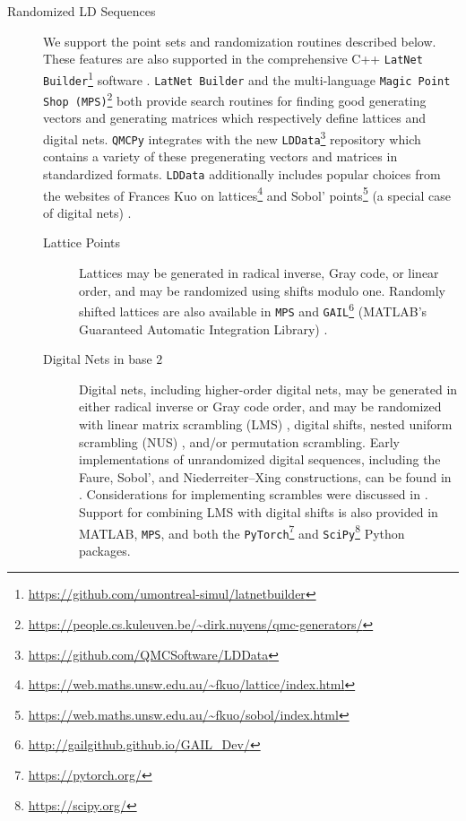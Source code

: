 \documentclass[acmsmall]{acmart}
\begin{document}
\begin{description}
    \item[Randomized LD Sequences] We support the point sets and randomization routines described below. These features are also supported in the comprehensive C++ \texttt{LatNet Builder}\footnote{\label{url:latnetbuilder}\url{https://github.com/umontreal-simul/latnetbuilder}} software \citep{LatNetBuilder.software}. \texttt{LatNet Builder} and the multi-language \texttt{Magic Point Shop (MPS)}\footnote{\label{url:mps}\url{https://people.cs.kuleuven.be/~dirk.nuyens/qmc-generators/}} \citep{MagicPointShop.software} both provide search routines for finding good generating vectors and generating matrices which respectively define lattices and digital nets. \texttt{QMCPy} integrates with the new \texttt{LDData}\footnote{\label{url:lddata}\url{https://github.com/QMCSoftware/LDData}} repository which contains a variety of these pregenerating vectors and matrices in standardized formats. \texttt{LDData} additionally includes popular choices from the websites of Frances Kuo on lattices\footnote{\url{https://web.maths.unsw.edu.au/~fkuo/lattice/index.html}} \citep{cools2006constructing,nuyens2006fast} and Sobol' points\footnote{\url{https://web.maths.unsw.edu.au/~fkuo/sobol/index.html}} (a special case of digital nets) \citep{joe2003remark,joe2008constructing}.
    \begin{description}
        \item[Lattice Points] Lattices may be generated in radical inverse, Gray code, or linear order, and may be randomized using shifts modulo one. Randomly shifted lattices are also available in \texttt{MPS} and \texttt{GAIL}\footnote{\label{url:gail}\url{http://gailgithub.github.io/GAIL_Dev/}} (MATLAB's Guaranteed Automatic Integration Library) \citep{GAIL.software,hickernell2018monte}.
        \item[Digital Nets in base $2$] Digital nets, including higher-order digital nets, may be generated in either radical inverse or Gray code order, and may be randomized with linear matrix scrambling (LMS) \citep{owen.variance_alternative_scrambles_digital_net}, digital shifts, nested uniform scrambling (NUS) \citep{owen1995randomly}, and/or permutation scrambling. Early implementations of unrandomized digital sequences, including the Faure, Sobol', and Niederreiter--Xing constructions, can be found in \citep{fox1986algorithm,bratley1992implementation,bratley2003implementing,pirsic2002software}. Considerations for implementing scrambles were discussed in \citep{hong2003algorithm}. Support for combining LMS with digital shifts is also provided in MATLAB, \texttt{MPS}, and both the \texttt{PyTorch}\footnote{\label{url:pytorch}\url{https://pytorch.org/}} \citep{paszke2019pytorch} and \texttt{SciPy}\footnote{\label{url:scipy}\url{https://scipy.org/}} \citep{virtanen2020scipy} Python packages.

\end{description}
\end{description}
\end{document}
